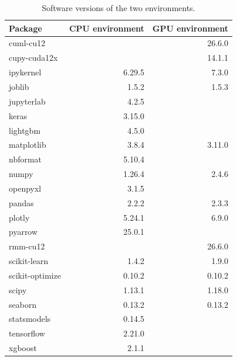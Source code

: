 \begin{table}[t]
\centering
\caption{Software versions of the two environments.}
\label{tab:software}
\begin{tabular}{lrr}
\toprule
Package & CPU environment & GPU environment \\
\midrule
cuml-cu12 &  & 26.6.0 \\
cupy-cuda12x &  & 14.1.1 \\
ipykernel & 6.29.5 & 7.3.0 \\
joblib & 1.5.2 & 1.5.3 \\
jupyterlab & 4.2.5 &  \\
keras & 3.15.0 &  \\
lightgbm & 4.5.0 &  \\
matplotlib & 3.8.4 & 3.11.0 \\
nbformat & 5.10.4 &  \\
numpy & 1.26.4 & 2.4.6 \\
openpyxl & 3.1.5 &  \\
pandas & 2.2.2 & 2.3.3 \\
plotly & 5.24.1 & 6.9.0 \\
pyarrow & 25.0.1 &  \\
rmm-cu12 &  & 26.6.0 \\
scikit-learn & 1.4.2 & 1.9.0 \\
scikit-optimize & 0.10.2 & 0.10.2 \\
scipy & 1.13.1 & 1.18.0 \\
seaborn & 0.13.2 & 0.13.2 \\
statsmodels & 0.14.5 &  \\
tensorflow & 2.21.0 &  \\
xgboost & 2.1.1 &  \\
\bottomrule
\end{tabular}
\end{table}
